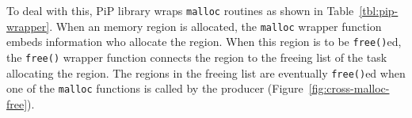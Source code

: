 To deal with this, PiP library wraps {\tt malloc} routines as shown in
Table~\ref{tbl:pip-wrapper}. When an memory region is allocated, the
{\tt malloc} wrapper function embeds information who allocate the
region. When this region is to be {\tt free()}ed, the {\tt free()}
wrapper function connects the region to the freeing list of the task
allocating the region. The regions in the freeing list are eventually
{\tt free()}ed when one of the {\tt malloc} functions is called by the
producer (Figure~\ref{fig:cross-malloc-free}). 
